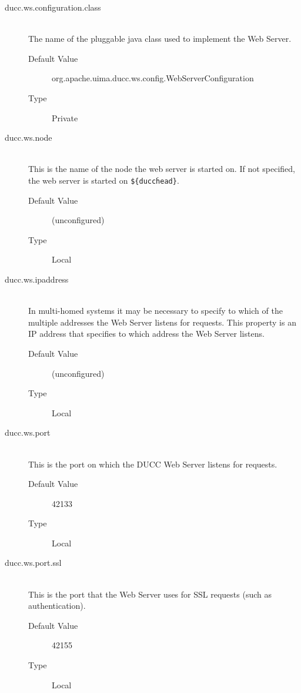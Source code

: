     \begin{description}
        \item[ducc.ws.configuration.class] \hfill \\
          The name of the pluggable java class used to implement the Web Server. 
          \begin{description}
            \item[Default Value] org.apache.uima.ducc.ws.config.WebServerConfiguration 
            \item[Type] Private 
          \end{description}
        
        \item[ducc.ws.node] \hfill \\
          This is the name of the node the web server is started on. If not specified, the web server is 
          started on {\tt \$\{ducc\.head\}}.
          \begin{description}
            \item[Default Value] (unconfigured) 
            \item[Type] Local 
          \end{description}
            

        \item[ducc.ws.ipaddress] \hfill \\
          In multi-homed systems it may be necessary to specify to which of the multiple addresses 
          the Web Server listens for requests. This property is an IP address that specifies to which 
          address the Web Server listens. 
          \begin{description}
            \item[Default Value] (unconfigured) 
            \item[Type] Local 
          \end{description}
              
        \item[ducc.ws.port] \hfill \\
          This is the port on which the DUCC Web Server listens for requests. 
          \begin{description}
            \item[Default Value] 42133 
            \item[Type] Local 
          \end{description}

        \item[ducc.ws.port.ssl] \hfill \\
          This is the port that the Web Server uses for SSL requests (such as authentication). 
          \begin{description}
            \item[Default Value] 42155 
            \item[Type] Local 
          \end{description}
                    

\end{description}
